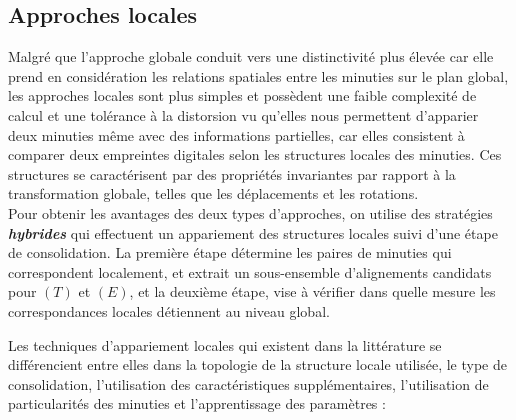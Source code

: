\subsection{Approches locales }
Malgré que l'approche globale conduit vers une distinctivité plus élevée car elle prend en considération les relations spatiales entre les minuties sur le plan global, les approches locales sont plus simples et possèdent une faible complexité de calcul et une tolérance à la distorsion vu qu'elles nous permettent d'apparier deux minuties même avec des informations partielles, car elles consistent à comparer deux empreintes digitales selon les structures locales des minuties. Ces structures se caractérisent par des propriétés invariantes par rapport à la transformation globale, telles que les déplacements et les rotations.
\\ Pour obtenir les avantages des deux types d'approches, on utilise des stratégies \textit{\textbf{hybrides}} qui effectuent un appariement des structures locales suivi d'une étape de consolidation. La première étape détermine les paires de minuties qui correspondent localement, et extrait un sous-ensemble d'alignements candidats pour $ (T) $ et $ (E) $, et la deuxième étape, vise à vérifier dans quelle mesure les correspondances locales détiennent au niveau global. 

Les techniques d'appariement locales qui existent dans la littérature se différencient entre elles dans la topologie de la structure locale utilisée, le type de consolidation, l'utilisation des caractéristiques supplémentaires, l'utilisation de particularités des minuties et l'apprentissage des paramètres \citep{Peralta2015a} :
